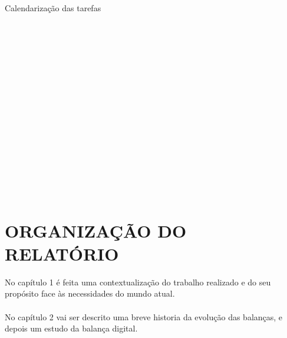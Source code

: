 \begin{table}[H]
	\caption{Calendarização das tarefas}
	\begin{ganttchart}{1}{20}
		\\
		\\
		 \\
		 \\
		 \\
		\\
		 \\
		 \\
		 \\%
		 \\%
		\\
		 \\
		 \\
		 \\
		 \\
	\end{ganttchart}
	\label{gantt}
\end{table}
\newpage
\section{ORGANIZAÇÃO DO RELATÓRIO}
No capítulo 1 é feita uma contextualização do trabalho realizado e do seu propósito face às necessidades do mundo atual.\\
\\
No capítulo 2 vai ser descrito uma breve historia da evolução das balanças, e depois um estudo da balança digital.

